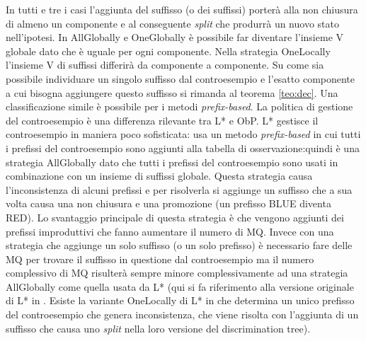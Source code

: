 In tutti e tre i casi l'aggiunta del suffisso (o dei suffissi) porterà alla non chiusura di almeno un componente e al conseguente \textit{split} che produrrà un nuovo stato nell'ipotesi.  In AllGlobally e OneGlobally è possibile far diventare l'insieme V globale dato che è uguale per ogni componente. Nella strategia OneLocally l'insieme V di suffissi differirà da componente a componente. Su come sia possibile individuare un singolo suffisso dal controesempio e l'esatto componente a cui bisogna aggiungere questo suffisso si rimanda al teorema \ref{teo:dec}.
Una classificazione simile è possibile per i metodi \textit{prefix-based}.
 La politica di gestione del controesempio è una differenza rilevante tra L* e \ac{ObP}. L* gestisce il controesempio in maniera poco sofisticata: usa un metodo \textit{prefix-based} in cui tutti i prefissi del controesempio sono aggiunti alla tabella di osservazione:quindi è una strategia AllGlobally dato che tutti i prefissi del controesempio sono usati in combinazione con un insieme di suffissi globale. Questa strategia causa l'inconsistenza di alcuni prefissi e per risolverla si aggiunge un suffisso che a sua volta causa una non chiusura e una promozione (un prefisso BLUE diventa RED). Lo svantaggio principale di questa strategia è che vengono aggiunti dei prefissi improduttivi che fanno aumentare il numero di \ac{MQ}. Invece con una strategia che aggiunge un solo suffisso (o un solo prefisso) è necessario fare delle \ac{MQ} per trovare il suffisso in questione dal controesempio ma il numero complessivo di \ac{MQ} risulterà sempre minore complessivamente ad una strategia AllGlobally come quella usata da L* (qui si fa riferimento alla versione originale di L* in \cite{Angluin87}. Esiste la variante OneLocally di L* in \cite{Kearns94} che determina un unico prefisso del controesempio  che genera inconsistenza, che viene risolta con l'aggiunta di un suffisso che causa uno \textit{split} nella loro versione del discrimination tree). 

